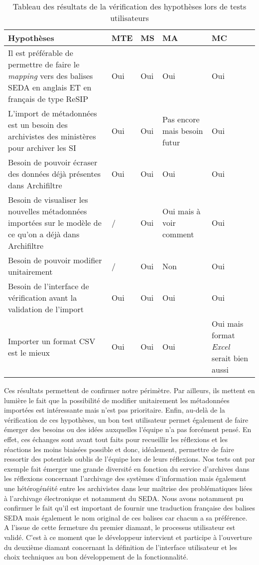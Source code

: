 \clearpage

\begin{table}[h]
	\begin{tabular}{|p{7cm}|p{2cm}|p{2cm}|p{2cm}|p{2cm}|}
		\hline
		\textbf{Hypothèses} & \textbf{MTE} & \textbf{MS} & \textbf{MA} & \textbf{MC} \\
		\hline
		Il est préférable de permettre de faire le \textit{mapping} vers des balises \gls{SEDA} en anglais ET en français de type ReSIP & Oui & Oui & Oui & Oui \\
		\hline
		L’import de métadonnées est un besoin des archivistes des ministères pour archiver les SI & Oui & Oui & Pas encore mais besoin futur & Oui \\
		\hline
		Besoin de pouvoir écraser des données déjà présentes dans \gls{Archifiltre} & Oui & Oui & Oui & Oui \\
		\hline
		Besoin de visualiser les nouvelles métadonnées importées sur le modèle de ce qu’on a déjà dans \gls{Archifiltre}  & / & Oui & Oui mais à voir comment & Oui \\
		\hline
		Besoin de pouvoir modifier unitairement & / & Oui & Non & Oui \\
		\hline
		Besoin de l’interface de vérification avant la validation de l’import & Oui & Oui & Oui & Oui \\
		\hline
		Importer un format CSV est le mieux & Oui & Oui & Oui & Oui mais format \textit{Excel} serait bien aussi \\
		\hline
	\end{tabular}
	\caption{Tableau des résultats de la vérification des hypothèses lors de tests utilisateurs}
\end{table}

Ces résultats permettent de confirmer notre périmètre. Par ailleurs, ils mettent en lumière le fait que la possibilité de modifier unitairement les métadonnées importées est intéressante mais n’est pas prioritaire. Enfin, au-delà de la vérification de ces hypothèses, un bon test utilisateur permet également de faire émerger des besoins ou des idées auxquelles l’équipe n’a pas forcément pensé. En effet, ces échanges sont avant tout faits pour recueillir les réflexions et les réactions les moins biaisées possible et donc, idéalement, permettre de faire ressortir des potentiels oublis de l’équipe lors de leurs réflexions. Nos tests ont par exemple fait émerger une grande diversité en fonction du service d’archives dans les réflexions concernant l’archivage des systèmes d’information mais également une hétérogénéité entre les archivistes dans leur maîtrise des problématiques liées à l’archivage électronique et notamment du \gls{SEDA}. Nous avons notamment pu confirmer le fait qu’il est important de fournir une traduction française des balises \gls{SEDA} mais également le nom original de ces balises car chacun a sa préférence. 
\\

A l'issue de cette fermeture du premier diamant, le processus utilisateur est validé. C’est à ce moment que le développeur intervient et participe à l’ouverture du deuxième diamant concernant la définition de l’interface utilisateur et les choix techniques au bon développement de la fonctionnalité. 